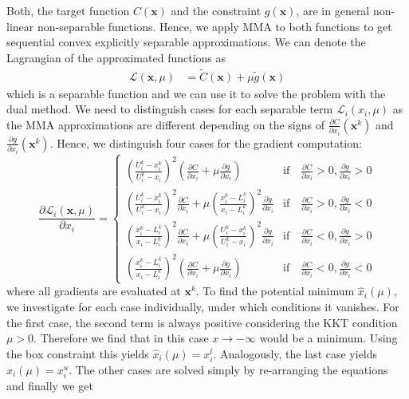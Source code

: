 Both, the target function $C(\mathbf{x})$ and the constraint $g(\mathbf{x})$, are in general non-linear non-separable functions. Hence, we apply MMA to both functions to get sequential convex explicitly separable approximations.
We can denote the Lagrangian of the approximated functions as 
\begin{align}
    \mathcal{L}(\mathbf{x}, \mu) &= \tilde{C}(\mathbf{x}) + \mu \tilde{g}(\mathbf{x})
    \label{eq:shape_lagrangian}
\end{align}
which is a separable function and we can use it to solve the problem with the dual method. We need to distinguish cases for each separable term $\mathcal{L}_i(x_i, \mu)$ as the MMA approximations are different depending on the signs of $\frac{\partial C}{\partial x_i} (\mathbf{x}^k)$ and $\frac{\partial g}{\partial x_i} (\mathbf{x}^k)$. Hence, we distinguish four cases for the gradient computation:
\begin{equation}
    \frac{\partial \mathcal{L}_i (\mathbf{x}, \mu)}{\partial x_i} = 
    \begin{cases}
        \left(\frac{U_i^k-x_i^k}{U_i^k-x_i}\right)^2 \left(\frac{\partial C}{\partial x_i} + \mu \frac{\partial g}{\partial x_i} \right) 
            &\textrm{if} \quad \frac{\partial C}{\partial x_i} > 0, \frac{\partial g}{\partial x_i} > 0 \\
        \left(\frac{U_i^k-x_i^k}{U_i^k-x_i}\right)^2 \frac{\partial C}{\partial x_i}  + \mu \left(\frac{x_i^k-L_i^k}{x_i-L_i^k}\right)^2 \frac{\partial g}{\partial x_i} 
            &\textrm{if} \quad \frac{\partial C}{\partial x_i}  > 0, \frac{\partial g}{\partial x_i} <0\\
        \left(\frac{x_i^k-L_i^k}{x_i-L_i^k}\right)^2 \frac{\partial C}{\partial x_i}  + \mu \left(\frac{U_i^k-x_i^k}{U_i^k-x_i}\right)^2\frac{\partial g}{\partial x_i} 
            &\textrm{if} \quad \frac{\partial C}{\partial x_i} < 0, \frac{\partial g}{\partial x_i}  > 0\\
        \left(\frac{x_i^k-L_i^k}{x_i-L_i^k}\right)^2 \left(\frac{\partial C}{\partial x_i}  + \mu \frac{\partial g}{\partial x_i} \right) 
            &\textrm{if} \quad \frac{\partial C}{\partial x_i}< 0, \frac{\partial g}{\partial x_i}< 0
    \end{cases}
\end{equation}
where all gradients are evaluated at $\mathbf{x}^k$.
To find the potential minimum $\hat{x}_i(\mu)$, we investigate for each case individually, under which conditions it vanishes. For the first case, the second term is always positive considering the KKT condition $\mu>0$. Therefore we find that in this case $x\rightarrow -\infty$ would be a minimum. Using the box constraint this yields $\hat{x}_i(\mu) = x^l_i$. Analogously, the last case yields $\hat{x}_i(\mu) = x^u_i$. The other cases are solved simply by re-arranging the equations and finally we get 
